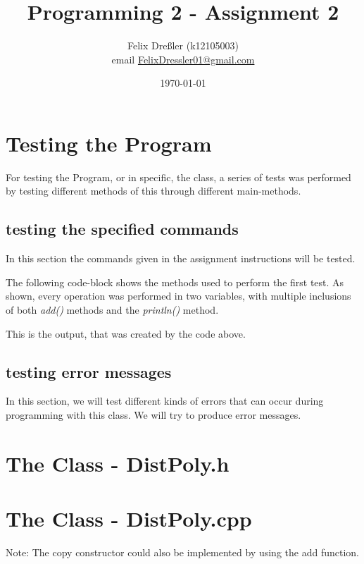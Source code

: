 \documentclass[11pt,titlepage]{article}
\title{Programming 2 - Assignment 2}
\author{Felix Dreßler (k12105003)\\ email \href{mailto:FelixDressler01@gmail.com}{FelixDressler01@gmail.com}}
\date{\today} %
\begin{document}
\maketitle
	\section{Testing the Program}
	For testing the Program, or in specific, the class, a series of tests was performed by testing different methods of this through different main-methods.
	
	\subsection{testing the specified commands}
	In this section the commands given in the assignment instructions will be tested.
	
	The following code-block shows the methods used to perform the first test. As shown, every operation was performed in two variables, with multiple inclusions of both \emph{add()} methods and the \emph{println()} method.
		
		
	This is the output, that was created by the code above.
		
		
	\subsection{testing error messages}
	In this section, we will test different kinds of errors that can occur during programming with this class.
	We will try to produce error messages.
	
	\subsubsection{}
	
\newpage		
	\section{The Class - DistPoly.h}
	
		
	
\newpage
	\section{The Class - DistPoly.cpp}
			
		Note: The copy constructor could also be implemented by using the add function.	
		
			
\end{document}
